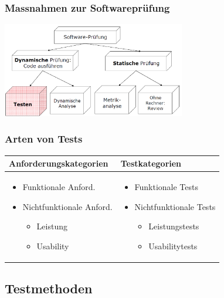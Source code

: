 \begin{multicols}{2}
	\subsubsection{Massnahmen zur Softwareprüfung}
\includegraphics[width = 8cm]{images/massnahmenSoftwarepruefung}
	
	\subsubsection{Arten von Tests}
	\begin{minipage}{10cm}
\begin{tabular}{|p{5cm}|p{4cm}|}
	\hline
	\textbf{Anforderungskategorien} & \textbf{Testkategorien} \\ \hline
	\begin{itemize}
		\item Funktionale Anford.
		\item Nichtfunktionale Anford.
		\begin{itemize}
			\item Leistung
			\item Usability
		\end{itemize}
		\end{itemize} & 
		\begin{itemize}
		\item Funktionale Tests
		\item Nichtfunktionale Tests
		\begin{itemize}
			\item Leistungstests
			\item Usabilitytests
		\end{itemize}
	\end{itemize} \\ \hline
\end{tabular}
\end{minipage}
\end{multicols}

\subsection{Testmethoden}
